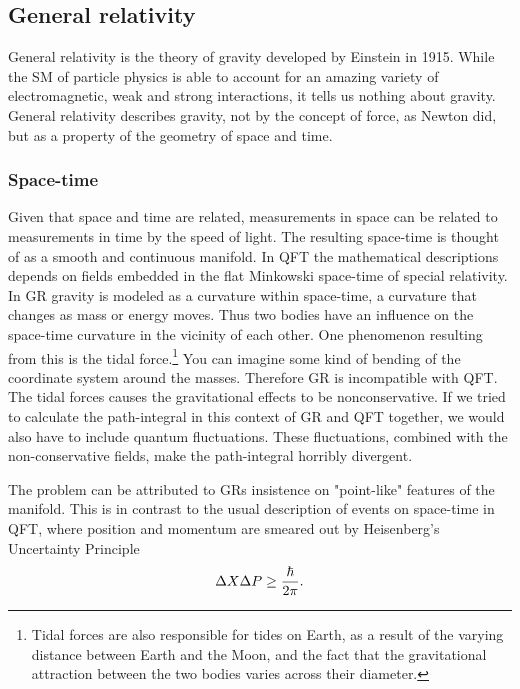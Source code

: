 \subsection{General relativity}
General relativity is the theory of gravity developed by Einstein in 1915. While the SM of particle physics is able to account for an amazing variety of electromagnetic, weak and strong interactions, it tells us nothing about gravity. General relativity describes gravity, not by the concept of force, as Newton did, but as a property of the geometry of space and time.

\subsubsection{Space-time}
Given that space and time are related, measurements in space can be related to measurements in time by the speed of light. The resulting space-time is thought of as a smooth and continuous manifold. In QFT the mathematical descriptions depends on fields embedded in the flat Minkowski space-time of special relativity. In GR gravity is modeled as a curvature within space-time, a curvature that changes as mass or energy moves. Thus two bodies have an influence on the space-time curvature in the vicinity of each other. One phenomenon resulting from this is the tidal force.\footnote{Tidal forces are also responsible for tides on Earth, as a result of the varying distance between Earth and the Moon, and the fact that the gravitational attraction between the two bodies varies across their diameter.} You can imagine some kind of bending of the coordinate system around the masses. Therefore GR is incompatible with QFT. The tidal forces causes the gravitational effects to be nonconservative. If we tried to calculate the path-integral in this context of GR and QFT together, we would also have to include quantum fluctuations. These fluctuations, combined with the non-conservative fields, make the path-integral horribly divergent.

The problem can be attributed to GRs insistence on "point-like" features of the manifold. This is in contrast to the usual description of events on space-time in QFT, where position and momentum are smeared out by Heisenberg's Uncertainty Principle
\begin{equation} \label{eq:heisenberg}
	\Delta X \Delta P \geq {\hbar \over 2 \pi}.
\end{equation}

